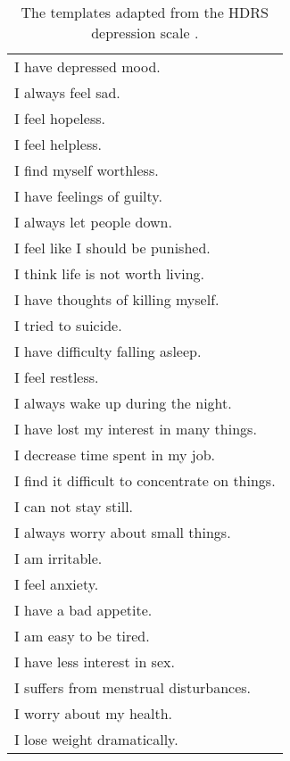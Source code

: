 \begin{table}
    \centering
    \small
    \begin{tabular}{l}
      \hline
      I have depressed mood. \\
      I always feel sad. \\
      I feel hopeless. \\
      I feel helpless. \\
      I find myself worthless. \\
      I have feelings of guilty. \\
      I always let people down. \\
      I feel like I should be punished. \\
      I think life is not worth living. \\
      I have thoughts of killing myself. \\
      I tried to suicide. \\
      I have difficulty falling asleep. \\
      I feel restless. \\
      I always wake up during the night. \\
      I have lost my interest in many things. \\
      I decrease time spent in my job. \\
      I find it difficult to concentrate on things. \\
      I can not stay still. \\
      I always worry about small things. \\
      I am irritable. \\
      I feel anxiety. \\
      I have a bad appetite. \\
      I am easy to be tired. \\
      I have less interest in sex. \\
      I suffers from menstrual disturbances. \\
      I worry about my health. \\
      I lose weight dramatically. \\
      \hline
    \end{tabular}
    \caption{\label{tab:Hamilton} The templates adapted from the HDRS depression scale \citep{hamilton1986hamilton}. }
  \end{table}
  
